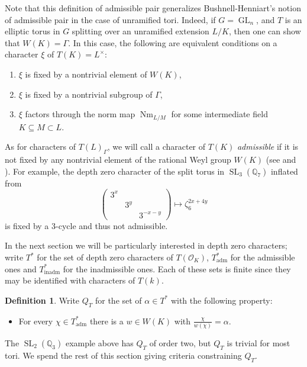 \documentclass[11pt]{amsart}
\theoremstyle{plain}
\theoremstyle{definition}
\newtheorem{definition}[theorem]{Definition}
\DeclareMathOperator{\Nm}{Nm}
\DeclareMathOperator{\GL}{GL}
\DeclareMathOperator{\SL}{SL}
\newcommand{\OK}{\mathcal{O}_K}
\newcommand{\QQ}{\mathbb{Q}}
\newcommand{\Lx}{L^\times}
\newcommand{\Thadm}{T^*_{\operatorname{adm}}}
\newcommand{\Thinadm}{T^*_{\operatorname{inadm}}}
\newcommand{\hatT}{T^*}
\begin{document}
Note that this definition of admissible pair generalizes
Bushnell-Henniart's notion of admissible pair \cite{bushnell-henniart:10a} in
the case of unramified tori.  Indeed,
if $G = \GL_n$, and $T$ is an elliptic torus in $G$ splitting over
an unramified extension $L/K$, then one can show that
$W(K) = \Gamma$.  In this case, the following are equivalent conditions
on a character $\xi$ of $T(K) = \Lx$:
\begin{enumerate}
\item $\xi$ is fixed by a nontrivial element of $W(K)$,
\item $\xi$ is fixed by a nontrivial subgroup of $\Gamma$,
\item $\xi$ factors through the norm map $\Nm_{L/M}$ for some intermediate field $K \subseteq M \subset L$.
\end{enumerate}

As for characters of $T(L)_\Gamma$, we will call a character of $T(K)$ \emph{admissible}
if it is not fixed by any nontrivial element
of the rational Weyl group $W(K)$ (see \cite[p. 802]{reeder-debacker:09a} and \cite[\S3]{reeder:08a}).
For example, the depth zero character of the split torus in $\SL_3(\QQ_7)$ inflated from
$$\begin{pmatrix} 3^x & & \\ & 3^y & \\ & & 3^{-x-y} \end{pmatrix} \mapsto \zeta_6^{2x + 4y}$$
is fixed by a 3-cycle and thus not admissible.

In the next section we will be particularly interested in depth zero characters; write $\hatT$ for the set of
depth zero characters of $T(\OK)$, $\Thadm$ for the admissible
ones and $\Thinadm$ for the inadmissible ones.  Each of these
sets is finite since they may be identified with characters of $T(k)$.

\begin{definition}
Write $Q_T$ for the set of $\alpha \in \hatT$ with the following property:
\begin{itemize}
\item For every $\chi \in \Thadm$ there is a $w \in W(K)$ with $\frac{\chi}{w(\chi)} = \alpha$.
\end{itemize}
\end{definition}

The $\SL_2(\QQ_3)$ example above has $Q_T$ of order two, but $Q_T$ is trivial for most tori.
We spend the rest of this section giving criteria constraining $Q_T$.
\end{document}
